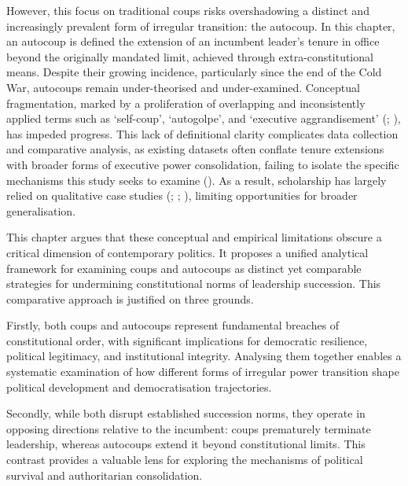\documentclass[
  12pt,
]{report}
\begin{document}
However, this focus on traditional coups risks overshadowing a distinct
and increasingly prevalent form of irregular transition: the autocoup.
In this chapter, an autocoup is defined the extension of an incumbent
leader's tenure in office beyond the originally mandated limit, achieved
through extra-constitutional means. Despite their growing incidence,
particularly since the end of the Cold War, autocoups remain
under-theorised and under-examined. Conceptual fragmentation, marked by
a proliferation of overlapping and inconsistently applied terms such as
`self-coup', `autogolpe', and `executive aggrandisement'
(;
), has impeded
progress. This lack of definitional clarity complicates data collection
and comparative analysis, as existing datasets often conflate tenure
extensions with broader forms of executive power consolidation, failing
to isolate the specific mechanisms this study seeks to examine
(). As a result,
scholarship has largely relied on qualitative case studies
(;
;
),
limiting opportunities for broader generalisation.

This chapter argues that these conceptual and empirical limitations
obscure a critical dimension of contemporary politics. It proposes a
unified analytical framework for examining coups and autocoups as
distinct yet comparable strategies for undermining constitutional norms
of leadership succession. This comparative approach is justified on
three grounds.

Firstly, both coups and autocoups represent fundamental breaches of
constitutional order, with significant implications for democratic
resilience, political legitimacy, and institutional integrity. Analysing
them together enables a systematic examination of how different forms of
irregular power transition shape political development and
democratisation trajectories.

Secondly, while both disrupt established succession norms, they operate
in opposing directions relative to the incumbent: coups prematurely
terminate leadership, whereas autocoups extend it beyond constitutional
limits. This contrast provides a valuable lens for exploring the
mechanisms of political survival and authoritarian consolidation.
\end{document}

